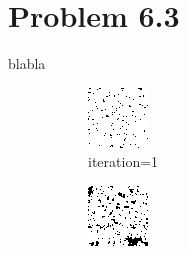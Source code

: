 \documentclass{article}
\begin{document}
\section*{Problem 6.3}
blabla
%
\begin{figure}[h]
\captionsetup[subfigure]{labelformat=empty}
\centering
\begin{subfigure}[t]{0.18\textwidth}
\centering
\includegraphics[width=\textwidth]{./computational/results/gibbs_node_sampler_positive_iter_0.png}
\vspace{-0.6cm}
\caption{iteration=1}
\end{subfigure}\hspace{0.01\textwidth}
\begin{subfigure}[t]{0.18\textwidth}
\centering
\includegraphics[width=\textwidth]{./computational/results/gibbs_node_sampler_positive_iter_100.png}

\end{subfigure}
\end{figure}
\end{document}
